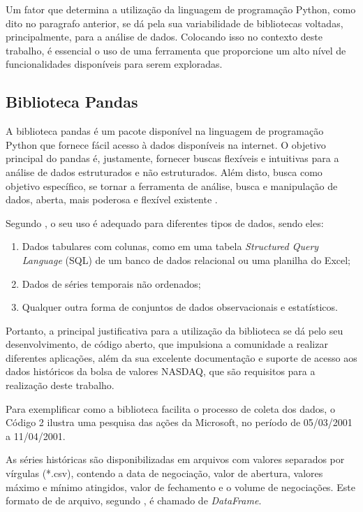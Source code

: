 Um fator que determina a utilização da linguagem de programação Python, como dito no paragrafo anterior, se dá pela sua variabilidade de bibliotecas voltadas, principalmente, para a análise de dados. Colocando isso no contexto deste trabalho, é essencial o uso de uma ferramenta que proporcione um alto nível de funcionalidades disponíveis para serem exploradas.

\subsection{Biblioteca Pandas}\label{pandas-lib}
A biblioteca pandas é um pacote disponível na linguagem de programação Python que fornece fácil acesso à dados disponíveis na internet. O objetivo principal do pandas é, justamente, fornecer buscas flexíveis e intuitivas para a análise de dados estruturados e não estruturados. Além disto, busca como objetivo específico, se tornar a ferramenta de análise, busca e manipulação de dados, aberta, mais poderosa e flexível existente \cite{pandas}.

Segundo , o seu uso é adequado para diferentes tipos de dados, sendo eles:
\begin{enumerate}
\item Dados tabulares com colunas, como em uma tabela \textit{Structured Query Language} (SQL) de um banco de dados relacional ou uma planilha do Excel;
\item Dados de séries temporais não ordenados;
\item Qualquer outra forma de conjuntos de dados observacionais e estatísticos.
\end{enumerate}

Portanto, a principal justificativa para a utilização da biblioteca se dá pelo seu desenvolvimento, de código aberto, que impulsiona a comunidade a realizar diferentes aplicações, além da sua excelente documentação e suporte de acesso aos dados históricos da bolsa de valores NASDAQ, que são requisitos para a realização deste trabalho.

Para exemplificar como a biblioteca facilita o processo de coleta dos dados, o Código 2 ilustra uma pesquisa das ações da Microsoft, no período de 05/03/2001 a 11/04/2001.
\codigoPython\


As séries históricas são disponibilizadas em arquivos com valores separados por vírgulas (*.csv), contendo a data de negociação, valor de abertura, valores máximo e mínimo atingidos, valor de fechamento e o volume de negociações. Este formato de de arquivo, segundo , é chamado de \textit{DataFrame}.

